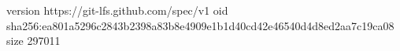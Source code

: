 version https://git-lfs.github.com/spec/v1
oid sha256:ea801a5296c2843b2398a83b8e4909e1b1d40cd42e46540d4d8ed2aa7c19ca08
size 297011
